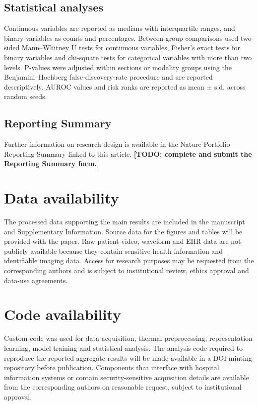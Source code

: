 \documentclass[pdflatex,sn-basic,Numbered]{sn-jnl}
\theoremstyle{thmstyleone}%
\theoremstyle{thmstyletwo}%
\theoremstyle{thmstylethree}%
\begin{document}
\subsection{Statistical analyses}

Continuous variables are reported as medians with interquartile ranges, and binary variables as counts and percentages. Between-group comparisons used two-sided Mann--Whitney U tests for continuous variables, Fisher's exact tests for binary variables and chi-square tests for categorical variables with more than two levels. P-values were adjusted within sections or modality groups using the Benjamini--Hochberg false-discovery-rate procedure and are reported descriptively. AUROC values and risk ranks are reported as mean $\pm$ s.d. across random seeds.

\subsection{Reporting Summary}

Further information on research design is available in the Nature Portfolio Reporting Summary linked to this article. \textbf{[TODO: complete and submit the Reporting Summary form.]}

\section*{Data availability}

The processed data supporting the main results are included in the manuscript and Supplementary Information. Source data for the figures and tables will be provided with the paper. Raw patient video, waveform and EHR data are not publicly available because they contain sensitive health information and identifiable imaging data. Access for research purposes may be requested from the corresponding authors and is subject to institutional review, ethics approval and data-use agreements.

\section*{Code availability}

Custom code was used for data acquisition, thermal preprocessing, representation learning, model training and statistical analysis. The analysis code required to reproduce the reported aggregate results will be made available in a DOI-minting repository before publication. Components that interface with hospital information systems or contain security-sensitive acquisition details are available from the corresponding authors on reasonable request, subject to institutional approval.
\end{document}
